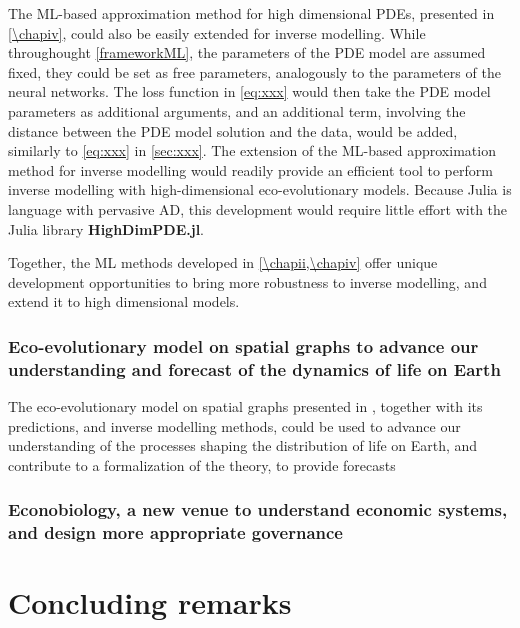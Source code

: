 The ML-based approximation method for high dimensional PDEs, presented in \cref{\chapiv}, could also be easily extended for inverse modelling.
% 
While throughought \cref{frameworkML}, the parameters of the PDE model are assumed fixed, they could be set as free parameters, analogously to the parameters of the neural networks. The loss function in \cref{eq:xxx} would then take the PDE model parameters as additional arguments, and an additional term, involving the distance between the PDE model solution and the data, would be added, similarly to \cref{eq:xxx} in \cref{sec:xxx}.
% 
The extension of the ML-based approximation method for inverse modelling would readily provide an efficient tool to perform inverse modelling with high-dimensional eco-evolutionary models. Because Julia is language with pervasive AD, this development would require little effort with the Julia library \textbf{HighDimPDE.jl}.

Together, the ML methods developed in \cref{\chapii,\chapiv} offer unique development opportunities to bring more robustness to inverse modelling, and extend it to high dimensional models.





\subsubsection{Eco-evolutionary model on spatial graphs to advance our understanding and forecast of the dynamics of life on Earth}
The eco-evolutionary model on spatial graphs presented in \chapi, together with its predictions, and inverse modelling methods, could be used to advance our understanding of the processes shaping the distribution of life on Earth, and contribute to a formalization of the theory, to provide forecasts


\subsubsection{Econobiology, a new venue to understand economic systems, and design more appropriate governance}


\section{Concluding remarks}

